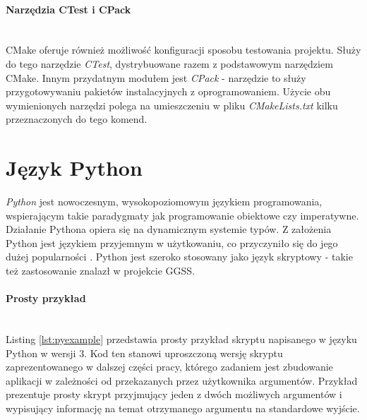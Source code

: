 \paragraph*{Narzędzia CTest i CPack}\mbox{} \\
CMake oferuje również możliwość konfiguracji sposobu testowania projektu. Służy do tego narzędzie \textit{CTest}, dystrybuowane razem z podstawowym narzędziem CMake. Innym przydatnym modułem jest \textit{CPack} - narzędzie to służy przygotowywaniu pakietów instalacyjnych z oprogramowaniem. Użycie obu wymienionych narzędzi polega na umieszczeniu w pliku \textit{CMakeLists.txt} kilku przeznaczonych do tego komend. \par 


\section{Język Python}
\textit{Python} jest nowoczesnym, wysokopoziomowym językiem programowania, wspierającym takie paradygmaty jak programowanie obiektowe czy imperatywne. Działanie Pythona opiera się na dynamicznym systemie typów. Z założenia Python jest językiem przyjemnym w użytkowaniu, co przyczyniło się do jego dużej popularności \cite{Lutz}. Python jest szeroko stosowany jako język skryptowy - takie też zastosowanie znalazł w projekcie GGSS.

\paragraph*{Prosty przykład}\mbox{} \\
Listing \ref{lst:pyexample} przedstawia prosty przykład skryptu napisanego w języku Python w wersji 3. Kod ten stanowi uproszczoną wersję skryptu zaprezentowanego w dalszej części pracy, którego zadaniem jest zbudowanie aplikacji w zależności od przekazanych przez użytkownika argumentów. Przykład prezentuje prosty skrypt przyjmujący jeden z dwóch możliwych argumentów i wypisujący informację na temat otrzymanego argumentu na standardowe wyjście.

